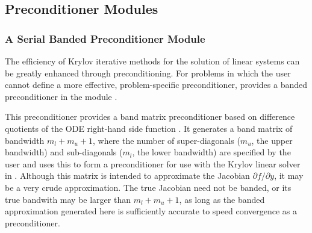 \subsection{{\cvode} Preconditioner Modules}\label{ss:preconds}

\subsubsection{A Serial Banded Preconditioner Module}\label{sss:cvbandpre}

The efficiency of Krylov iterative methods for the solution of linear systems 
can be greatly enhanced through preconditioning. For problems in which the 
user cannot define a more effective, problem-specific preconditioner,
{\cvode} provides a banded preconditioner in the module {\cvbandpre}.

This preconditioner provides a band matrix preconditioner based on
difference quotients of the ODE right-hand side function .
It generates a band matrix of bandwidth $m_l + m_u + 1$, where
the number of super-diagonals ($m_u$, the upper bandwidth) and
sub-diagonals ($m_l$, the lower bandwidth) are specified by
the user and uses this to form a preconditioner for use with the Krylov
linear solver in {\cvspgmr}.  Although this matrix is intended
to approximate the Jacobian $\partial f / \partial y$, 
it may be a very crude approximation.  The true Jacobian need not be banded, or its
true bandwith may be larger than $m_l + m_u + 1$, as long as the
banded approximation generated here is sufficiently accurate
to speed convergence as a preconditioner. 

